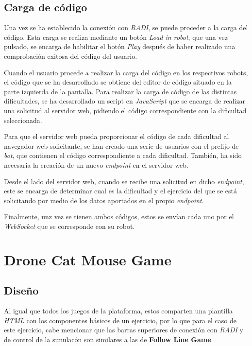 \documentclass[a4paper, 12pt]{book}
\begin{document}
\subsection{Carga de código}
\label{follow_line_game_code_load}

Una vez se ha establecido la conexión con \emph{RADI}, se puede proceder a la carga del código. Esta carga se realiza mediante un botón \emph{Load in robot}, que una vez pulsado, se encarga de habilitar el botón \emph{Play} después de haber realizado una comprobación exitosa del código del usuario.

Cuando el usuario procede a realizar la carga del código en los respectivos robots, el código que se ha desarrollado
se obtiene del editor de código situado en la parte izquierda de la pantalla. Para realizar la carga de código de las distintas dificultades, se ha desarrollado un script en \emph{JavaScript} que se encarga de realizar una solicitud al servidor web, pidiendo el código correspondiente con la dificultad seleccionada.

Para que el servidor web pueda proporcionar el código de cada dificultad al navegador web solicitante, se han creado una serie de usuarios con el prefijo de \emph{bot}, que contienen el código correspondiente a cada dificultad. También, ha sido necesaria la creación de un nuevo \emph{endpoint} en el servidor web.

Desde el lado del servidor web, cuando se recibe una solicitud en dicho \emph{endpoint}, este se encarga de determinar cual es la dificultad y el ejercicio del que se está solicitando por medio de los datos aportados en el propio \emph{endpoint}.

Finalmente, unz vez se tienen ambos códigos, estos se envían cada uno por el \emph{WebSocket} que se corresponde con su robot.  

\section{Drone Cat Mouse Game} 
\label{sec:drone_cat_mouse_game}

\subsection{Diseño}
\label{drone_cat_mouse_interface}

Al igual que todos los juegos de la plataforma, estos comparten una plantilla \emph{HTML} con los componentes básicos de un ejercicio, por lo que para el caso de este ejercicio, cabe mencionar que las barras superiores de conexión con \emph{RADI} y de control de la simulacón son similares a las de \textbf{Follow Line Game}.
\end{document}
